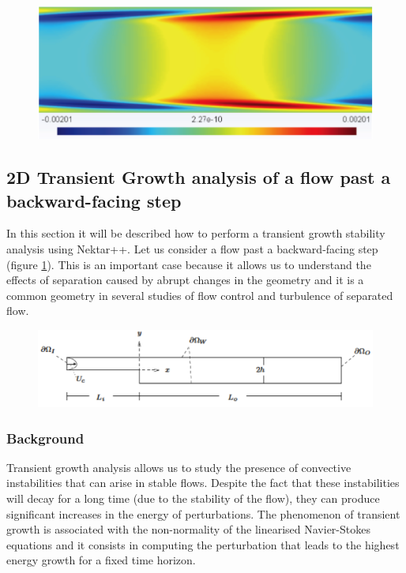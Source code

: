 \begin{figure}[!htbp]
\centering
 {\includegraphics[width=1 \textwidth]{Figures/chan_v_adj}}
    \caption {}
\end{figure}

\subsection{2D Transient Growth analysis of a flow past a backward-facing step}

In this section it will be described how to perform a transient growth stability analysis using Nektar++. Let us consider a flow past a backward-facing step (figure \ref{bfs_geo}). This is an important case because it allows us to understand  the effects of separation caused by abrupt changes in the geometry and it is a common geometry in several studies of flow control and turbulence of separated flow.

\begin{figure}[!htbp]
\centering
 {\includegraphics[width=1 \textwidth]{Figures/bfs_geo}}
    \caption {}\label{bfs_geo}
\end{figure}

\subsubsection{Background}

Transient growth analysis allows us to study the presence of convective instabilities that can arise in stable flows. Despite the fact that these instabilities will decay for a long time (due to the stability of the flow), they can produce significant increases in the energy of perturbations. The phenomenon of transient growth is associated with the non-normality of the linearised Navier-Stokes equations and it consists in computing the perturbation that leads to the highest energy growth for a fixed time horizon.

